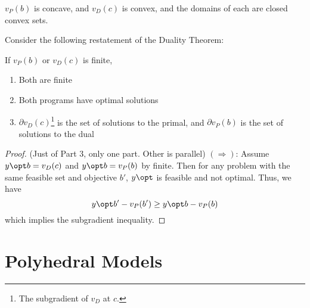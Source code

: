 \documentclass[10pt]{article}
\begin{document}
\begin{lemma}
	$v_P(b)$ is concave, and $v_D(c)$ is convex, and the domains of each are closed convex sets.
\end{lemma}

Consider the following restatement of the Duality Theorem:

\begin{theorem}
	If $v_P(b)$ or $v_D(c)$ is finite,
	\begin{enumerate}
		\item Both are finite
		\item Both programs have optimal solutions
		\item $\partial v_D(c)$\footnote{The subgradient of $v_D$ at $c$.} is the set of solutions to the primal, and $\partial v_P(b)$ is the set of solutions to the dual
	\end{enumerate}
\end{theorem}
\begin{proof}
	(Just of Part 3, only one part. Other is parallel) $(\Rightarrow)$: Assume $y\opt b = v_D(c)$ and $y\opt b = v_P(b)$ by finite. Then for any problem with the same feasible set and objective $b'$, $y\opt$ is feasible and not optimal. Thus, we have \[y\opt b' - v_P(b') \ge y\opt b - v_P(b)\]which implies the subgradient inequality.
\end{proof}



\section{Polyhedral Models}
\end{document}
